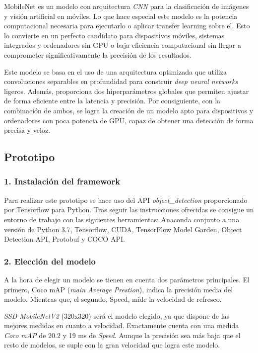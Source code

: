 MobileNet es un modelo con arquitectura \textit{CNN} para la clasificación de imágenes y visión artificial en móviles. Lo que hace especial este modelo es la potencia computacional necesaria para ejecutarlo o aplicar transfer learning sobre el. Esto lo convierte en un perfecto candidato para dispositivos móviles, sistemas integrados y ordenadores sin GPU o baja eficiencia computacional sin llegar a comprometer significativamente la precisión de los resultados.

Este modelo se basa en el uso de una arquitectura optimizada que utiliza convoluciones separables en profundidad para construir \textit{deep neural networks} ligeros. Además, proporciona dos hiperparámetros globales que permiten ajustar de forma eficiente entre la latencia y precisión. Por consiguiente, con la combinación de ambos, se logra la creación de un modelo apto para dispositivos y ordenadores con poca potencia de GPU, capaz de obtener una detección de forma precisa y veloz.

\subsection*{Prototipo}

\vspace{-0.5cm}
\subsubsection*{1. Instalación del framework}
\vspace{-0.7cm}
Para realizar este prototipo se hace uso del API \textit{object\_detection} proporcionado por Tensorflow para Python. Tras seguir las instrucciones ofrecidas se consigue un entorno de trabajo con las siguientes herramientas: Anaconda conjunto a una versión de Python 3.7, Tensorflow, CUDA, TensorFlow Model Garden,  Object Detection API, Protobuf y COCO API.

\vspace{-0.5cm}
\subsubsection*{2. Elección del modelo}
\vspace{-0.7cm}
A la hora de elegir un modelo se tienen en cuenta dos parámetros principales. El primero, Coco mAP (\textit{main Average Prestion}), indica la precisión media del modelo. Mientras que, el segundo, Speed, mide la velocidad de refresco.

\textit{SSD-MobileNetV2} (320x320) será el modelo elegido, ya que dispone de las mejores medidas en cuanto a velocidad. Exactamente cuenta con una medida \textit{Coco mAP} de 20.2 y 19 ms de \textit{Speed}. Aunque la precisión sea más baja que el resto de modelos, se suple con la gran velocidad que logra este modelo.

